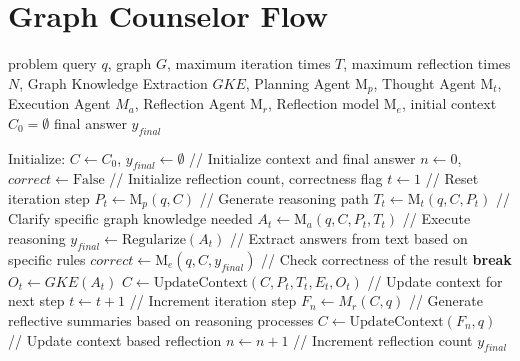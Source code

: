 \documentclass[11pt]{article}
\begin{document}
\section{Graph Counselor Flow}
\label{sec:appendixA}
\begin{algorithm*}
\caption{Graph Counselor Flow}
\begin{algorithmic}[1]
\REQUIRE problem query $q$, graph $G$, maximum iteration times $T$, maximum reflection times $N$, Graph Knowledge Extraction $GKE$, Planning Agent $\mathrm{M}_p$, Thought Agent $\mathrm{M}_t$, Execution Agent $M_a$, Reflection Agent $\mathrm{M}_r$, Reflection model $\mathrm{M}_e$, initial context $C_0 = \emptyset$
\ENSURE final answer $y_{final}$

\STATE Initialize:
\STATE $C \gets C_0$, $y_{final} \gets \emptyset$ // Initialize context and final answer
\STATE $n \gets 0$, $correct \gets \text{False}$ // Initialize reflection count, correctness flag
    \STATE $t \gets 1$ // Reset iteration step
        \STATE $P_t \gets \mathrm{M}_p(q, C)$ // Generate reasoning path
        \STATE $T_t \gets \mathrm{M}_t(q, C, P_t)$ // Clarify specific graph knowledge needed
        \STATE $A_t \gets \mathrm{M}_a(q, C, P_t, T_t)$ // Execute reasoning
            \STATE $y_{final} \gets \text{Regularize}(A_t)$ // Extract answers from text based on specific rules
            \STATE $correct \gets \mathrm{M}_e(q, C, y_{final})$ // Check correctness of the result
            \STATE \textbf{break}
        \ELSE
            \STATE $O_t \gets GKE(A_t)$
            \STATE $C \gets \text{UpdateContext}(C, P_t, T_t, E_t, O_t)$ // Update context for next step
        \ENDIF
        \STATE $t \gets t + 1$ // Increment iteration step
    \ENDWHILE
        \STATE $F_n \gets M_r(C, q)$ // Generate reflective summaries based on reasoning processes
        \STATE $C \gets \text{UpdateContext}(F_n, q)$ // Update context based reflection
        \STATE $n \gets n + 1$ // Increment reflection count
    \ENDIF
\ENDWHILE
\RETURN $y_{final}$
\end{algorithmic}
\end{algorithm*}

\clearpage
\end{document}
